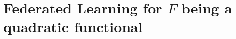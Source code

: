 \documentclass{article}
\def\text#1{{\rm #1}}
\theoremstyle{definition}
\begin{document}

\begin{comment}
\subsection{Scaffold}
Using our notation, we now introduce the ProxSkip algorithm. See algorithm~\ref{alg:ProxSkip}. 

\begin{algorithm}[H]
\caption{ProxSkip}\label{alg:ProxSkip}
Given a stepsize $\gamma > 0$, initial iterate $Z_0 = X_0 = (x_0, \dots, x_0) \in \mathbb{R}^{dn}$, $h_0$, number of iterations $T \geq 1$, we perform the following:  
\begin{algorithmic}
\For{$t=0, 1,2,\cdots,T-1$}
    \State{$X_{t+1} = Z_{t} - \gamma (\nabla F(Z_{t}) -h_t ) $}
    \State{Flip a coin $\theta_t$, $P(\theta_t = 1) = p $}
    \If{$\theta_t = 1$} 
    \State{$Z_{t+1} = {\rm prox}_{\frac{\gamma}{p}\psi } 
    \left ( X_{t+1} - \frac{\gamma}{p} h_t \right )$} 
    \Else
        \State{$Z_{t+1} = X_{t+1}$}
    \EndIf 
    \State{$h_{t+1} = h_t + \frac{p}{\gamma} (Z_{t+1} - X_{t+1})$} 
\EndFor
\end{algorithmic}
\end{algorithm}

A deterministic version of ProxSkip is given in algorithm \ref{alg:ProxSkip deterministic}. 

\begin{algorithm}[H]
\caption{ProxSkip Deterministic (SCAFFOLD)}\label{alg:ProxSkip deterministic}
Given a stepsize $\gamma > 0$, initial iterate $Z_0 = X_0 = (x_0, \dots, x_0) \in \mathbb{R}^{dn}$, number of iterations $T \geq 1$, we perform the following:  
\begin{algorithmic}
\For{$t=0, 1,2,\cdots,T-1$}
    \State{$X_t = Z_t$}
    \For{$k = 0, 1,\dots, N-1$}
    \State{$X_{t + \frac{k+1}{N}} = X_{t + \frac{k}{N}} - \gamma ( \nabla F(X_{t + \frac{k}{N}} ) - H_t)$ }
    \EndFor    
    \State{$Z_{t+1} = \text{prox}_{N\gamma \psi}(X_{t+1} - N\gamma H_t)$}
    \State{$H_{t+1} = H_t + \frac{1}{N \gamma }(Z_{t+1} - X_{t+1})$}
\EndFor
\end{algorithmic}
\end{algorithm}
\end{comment} 

\section{Federated Learning for $F$ being a quadratic functional}\label{prob}  
\end{document}
